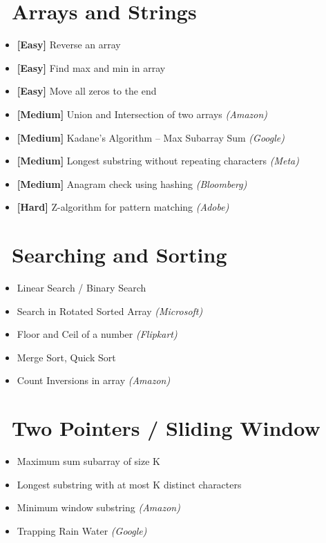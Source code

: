 
\section*{\ Arrays and Strings}
\begin{itemize}
  \item \textbf{[Easy]} Reverse an array
  \item \textbf{[Easy]} Find max and min in array
  \item \textbf{[Easy]} Move all zeros to the end
  \item \textbf{[Medium]} Union and Intersection of two arrays \textit{(Amazon)}
  \item \textbf{[Medium]} Kadane’s Algorithm – Max Subarray Sum \textit{(Google)}
  \item \textbf{[Medium]} Longest substring without repeating characters \textit{(Meta)}
  \item \textbf{[Medium]} Anagram check using hashing \textit{(Bloomberg)}
  \item \textbf{[Hard]} Z-algorithm for pattern matching \textit{(Adobe)}
\end{itemize}

\section*{\ Searching and Sorting}
\begin{itemize}
  \item Linear Search / Binary Search
  \item Search in Rotated Sorted Array \textit{(Microsoft)}
  \item Floor and Ceil of a number \textit{(Flipkart)}
  \item Merge Sort, Quick Sort
  \item Count Inversions in array \textit{(Amazon)}
\end{itemize}

\section*{\ Two Pointers / Sliding Window}
\begin{itemize}
  \item Maximum sum subarray of size K
  \item Longest substring with at most K distinct characters
  \item Minimum window substring \textit{(Amazon)}
  \item Trapping Rain Water \textit{(Google)}
\end{itemize}

